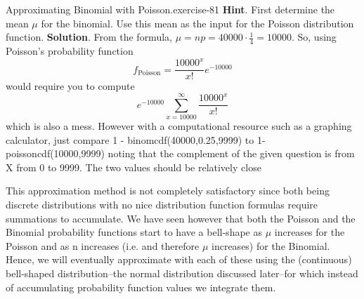 \documentclass[10pt,]{book}
\numberwithin{equation}{section}
\begin{document}
%
\par
\hypertarget{p-1163}{}%
\begin{inlineexercise}{Approximating Binomial with Poisson.}{exercise-81}%
\textbf{Hint}.\quad%
\hypertarget{p-1164}{}%
First determine the mean \(\mu\) for the binomial. Use this mean as the input for the Poisson distribution function.%
\textbf{Solution}.\quad%
\hypertarget{p-1165}{}%
From the formula, \(\mu = np = 40000 \cdot \frac{1}{4} = 10000\). So, using Poisson's probability function%
\begin{equation*}
f_{\text{Poisson}} = \frac{10000^{x}}{x!}e^{-10000}
\end{equation*}
would require you to compute%
\begin{equation*}
e^{-10000} \sum_{x=10000}^{\infty} \frac{10000^{x}}{x!}
\end{equation*}
which is also a mess. However with a computational resource such as a graphing calculator, just compare 1 - binomcdf(40000,0.25,9999) to 1-poissoncdf(10000,9999) noting that the complement of the given question is from X from 0 to 9999. The two values should be relatively close%
\par
\hypertarget{p-1166}{}%
This approximation method is not completely satisfactory since both being discrete distributions with no nice distribution function formulas require summations to accumulate. We have seen however that both the Poisson and the Binomial probability functions start to have a bell-shape as \(\mu\) increases for the Poisson and as n increases (i.e. and therefore \(\mu\) increases) for the Binomial. Hence, we will eventually approximate with each of these using the (continuous) bell-shaped distribution--the normal distribution discussed later--for which instead of accumulating probability function values we integrate them.%
\end{inlineexercise}
%
\par
\hypertarget{p-1167}{}%
\end{document}
